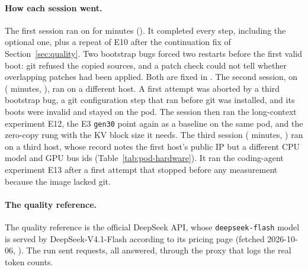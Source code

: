 \paragraph{How each session went.}
The first session ran on  for  minutes
(). It completed every step, including the optional one, plus a repeat of
E10 after the continuation fix of Section~\ref{sec:quality}. Two bootstrap bugs forced two restarts before the first
valid boot: git refused the copied sources, and a patch check could not tell whether overlapping patches had been
applied. Both are fixed in . The second session, on 
( minutes, ), ran on a different host. A first attempt
was aborted by a third bootstrap bug, a git configuration step that ran before git was installed, and its boots were
invalid and stayed on the pod. The session then ran the long-context experiment E12, the E3 \texttt{gen30} point again
as a baseline on the same pod, and the zero-copy rung with the KV block size it needs. The third session
( minutes, ) ran on a third host, whose record notes the
first host's public IP but a different CPU model and GPU bus ids (Table~\ref{tab:pod-hardware}). It ran the
coding-agent experiment E13 after a first attempt that stopped before any measurement because the image lacked git.

\paragraph{The quality reference.}
The quality reference is the official DeepSeek API, whose \texttt{deepseek-flash} model is served by
DeepSeek-V4.1-Flash according to its pricing page (fetched 2026-10-06, ). The run sent
 requests, all answered, through the proxy that logs the real token counts.

